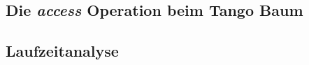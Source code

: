 \documentclass[a4paper,12pt]{article}
\begin{document}
\subsection{Die \textit{access} Operation beim Tango Baum}
\subsection{Laufzeitanalyse}
\newpage


\end{document}
